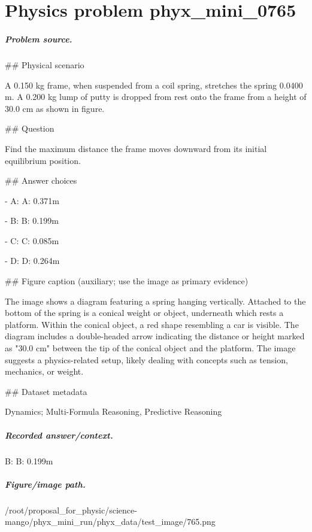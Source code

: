 
\chapter{Physics problem phyx\_mini\_0765}
\label{ch:PhyXMiniProblems_problem_phyx_mini_0765}

\paragraph{Problem source.}
\#\# Physical scenario

A 0.150 kg frame, when suspended from a coil spring, stretches the spring 0.0400 m. A 0.200 kg lump of putty is dropped from rest onto the frame from a height of 30.0 cm as shown in figure.

\#\# Question

Find the maximum distance the frame moves downward from its initial equilibrium position.

\#\# Answer choices

- A: A: 0.371m

- B: B: 0.199m

- C: C: 0.085m

- D: D: 0.264m

\#\# Figure caption (auxiliary; use the image as primary evidence)

The image shows a diagram featuring a spring hanging vertically. Attached to the bottom of the spring is a conical weight or object, underneath which rests a platform. Within the conical object, a red shape resembling a car is visible. The diagram includes a double-headed arrow indicating the distance or height marked as "30.0 cm" between the tip of the conical object and the platform. The image suggests a physics-related setup, likely dealing with concepts such as tension, mechanics, or weight.

\#\# Dataset metadata

Dynamics; Multi-Formula Reasoning, Predictive Reasoning

\paragraph{Recorded answer/context.}
B: B: 0.199m

\paragraph{Figure/image path.}
/root/proposal\_for\_physic/science-mango/phyx\_mini\_run/phyx\_data/test\_image/765.png

